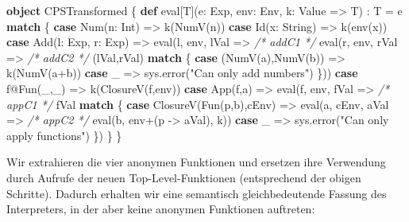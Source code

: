 \documentclass[]{article}
\newenvironment{Shaded}{}{}
\newcommand{\CommentTok}[1]{\textcolor[rgb]{0.38,0.63,0.69}{\textit{#1}}}
\newcommand{\FunctionTok}[1]{\textcolor[rgb]{0.02,0.16,0.49}{#1}}
\newcommand{\KeywordTok}[1]{\textcolor[rgb]{0.00,0.44,0.13}{\textbf{#1}}}
\newcommand{\NormalTok}[1]{#1}
\newcommand{\StringTok}[1]{\textcolor[rgb]{0.25,0.44,0.63}{#1}}
\begin{document}
\begin{Shaded}
\begin{Highlighting}[]
\KeywordTok{object}\NormalTok{ CPSTransformed \{}
  \KeywordTok{def}\NormalTok{ eval[T](e: Exp, env: Env, k: Value =\textgreater{} T) : T = e }\KeywordTok{match}\NormalTok{ \{}
    \KeywordTok{case} \FunctionTok{Num}\NormalTok{(n: Int) =\textgreater{} }\FunctionTok{k}\NormalTok{(}\FunctionTok{NumV}\NormalTok{(n))}
    \KeywordTok{case} \FunctionTok{Id}\NormalTok{(x: String) =\textgreater{} }\FunctionTok{k}\NormalTok{(}\FunctionTok{env}\NormalTok{(x))}
    \KeywordTok{case} \FunctionTok{Add}\NormalTok{(l: Exp, r: Exp) =\textgreater{}}
      \FunctionTok{eval}\NormalTok{(l, env, lVal =\textgreater{} }\CommentTok{/* addC1 */} 
        \FunctionTok{eval}\NormalTok{(r, env, rVal =\textgreater{} }\CommentTok{/* addC2 */}\NormalTok{ (lVal,rVal) }\KeywordTok{match}\NormalTok{ \{}
        \KeywordTok{case}\NormalTok{ (}\FunctionTok{NumV}\NormalTok{(a),}\FunctionTok{NumV}\NormalTok{(b)) =\textgreater{} }\FunctionTok{k}\NormalTok{(}\FunctionTok{NumV}\NormalTok{(a+b))}
        \KeywordTok{case}\NormalTok{ \_ =\textgreater{} sys.}\FunctionTok{error}\NormalTok{(}\StringTok{"Can only add numbers"}\NormalTok{)}
\NormalTok{      \}))}
    \KeywordTok{case}\NormalTok{ f@}\FunctionTok{Fun}\NormalTok{(\_,\_) =\textgreater{} }\FunctionTok{k}\NormalTok{(}\FunctionTok{ClosureV}\NormalTok{(f,env))}
    \KeywordTok{case} \FunctionTok{App}\NormalTok{(f,a) =\textgreater{}}
      \FunctionTok{eval}\NormalTok{(f, env, fVal =\textgreater{} }\CommentTok{/* appC1 */}\NormalTok{ fVal }\KeywordTok{match}\NormalTok{ \{}
        \KeywordTok{case} \FunctionTok{ClosureV}\NormalTok{(}\FunctionTok{Fun}\NormalTok{(p,b),cEnv) =\textgreater{} }\FunctionTok{eval}\NormalTok{(a, cEnv, aVal =\textgreater{} }\CommentTok{/* appC2 */} 
          \FunctionTok{eval}\NormalTok{(b, env+(p {-}\textgreater{} aVal), k))}
        \KeywordTok{case}\NormalTok{ \_ =\textgreater{} sys.}\FunctionTok{error}\NormalTok{(}\StringTok{"Can only apply functions"}\NormalTok{)}
\NormalTok{      \})}
\NormalTok{  \}}
\NormalTok{\}}
\end{Highlighting}
\end{Shaded}

Wir extrahieren die vier anonymen Funktionen und ersetzen ihre
Verwendung durch Aufrufe der neuen Top-Level-Funktionen (entsprechend
der obigen Schritte). Dadurch erhalten wir eine semantisch
gleichbedeutende Fassung des Interpreters, in der aber keine anonymen
Funktionen auftreten:
\end{document}
